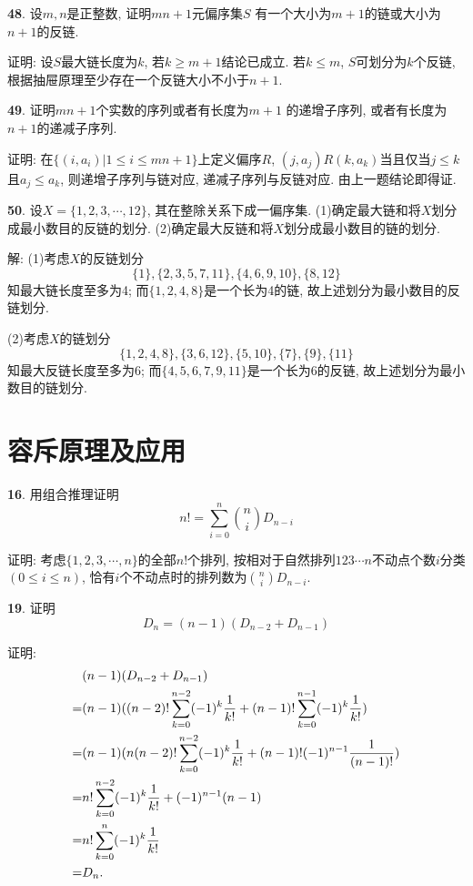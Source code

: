 \par \textbf{48}. 设$m,n$是正整数, 证明$mn+1$元偏序集$S$ 有一个大小为$m+1$的链或大小为$n+1$的反链.
\par 证明: 设$S$最大链长度为$k$, 若$k\ge m+1$结论已成立. 若$k\le m$, $S$可划分为$k$个反链, 根据抽屉原理至少存在一个反链大小不小于$n+1$.

\par \textbf{49}. 证明$mn+1$个实数的序列或者有长度为$m+1$ 的递增子序列, 或者有长度为$n+1$的递减子序列.
\par 证明: 在$\{(i,a_i)|1\le i\le mn+1\}$上定义偏序$R$, $(j,a_j)R(k,a_k)$当且仅当$j\le k$且$a_j\le a_k$, 则递增子序列与链对应, 递减子序列与反链对应. 由上一题结论即得证.

\par \textbf{50}. 设$X=\{1,2,3,\cdots,12\}$, 其在整除关系下成一偏序集. (1)确定最大链和将$X$划分成最小数目的反链的划分. (2)确定最大反链和将$X$划分成最小数目的链的划分.
\par 解: (1)考虑$X$的反链划分
\begin{displaymath}
\{1\},\{2,3,5,7,11\},\{4,6,9,10\},\{8,12\}
\end{displaymath}
知最大链长度至多为4; 而$\{1,2,4,8\}$是一个长为4的链, 故上述划分为最小数目的反链划分.
\par (2)考虑$X$的链划分
\begin{displaymath}
\{1,2,4,8\},\{3,6,12\},\{5,10\},\{7\},\{9\},\{11\}
\end{displaymath}
知最大反链长度至多为6; 而$\{4,5,6,7,9,11\}$是一个长为6的反链, 故上述划分为最小数目的链划分.

\section{容斥原理及应用}
\par \textbf{16}. 用组合推理证明
\begin{displaymath}
n!=\sum_{i=0}^n \binom{n}{i}D_{n-i}
\end{displaymath}
\par 证明: 考虑$\{1,2,3,\cdots,n\}$的全部$n!$个排列, 按相对于自然排列$123\cdots n$不动点个数$i$分类$(0\le i\le n)$, 恰有$i$个不动点时的排列数为$\binom{n}{i}D_{n-i}$.

\par \textbf{19}. 证明
\begin{displaymath}
D_n=(n-1)(D_{n-2}+D_{n-1})
\end{displaymath}
\par 证明:
\begin{align*}
&(n-1)(D_{n-2}+D_{n-1})\notag\\
=&(n-1)((n-2)!\sum_{k=0}^{n-2}(-1)^k\frac{1}{k!}+
(n-1)!\sum_{k=0}^{n-1}(-1)^k\frac{1}{k!})\notag\\
=&(n-1)(n(n-2)!\sum_{k=0}^{n-2}(-1)^k\frac{1}{k!}+
(n-1)!(-1)^{n-1}\frac{1}{(n-1)!})\notag\\
=&n!\sum_{k=0}^{n-2}(-1)^k\frac{1}{k!}+(-1)^{n-1}(n-1)\notag\\
=&n!\sum_{k=0}^{n}(-1)^k\frac{1}{k!}\notag\\
=&D_n. \notag
\end{align*}

